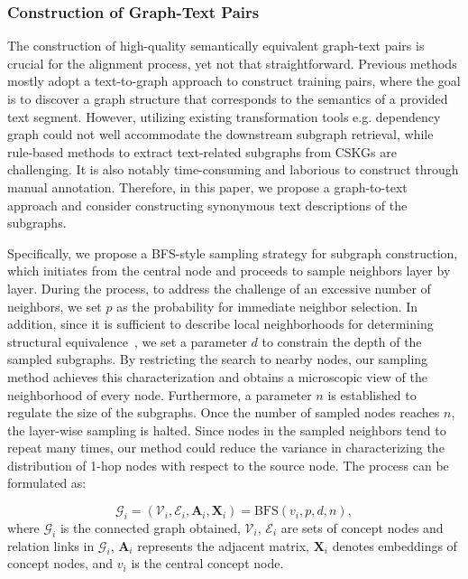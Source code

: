 \documentclass[runningheads]{llncs}
\begin{document}
\subsubsection{Construction of Graph-Text Pairs}
The construction of high-quality semantically equivalent graph-text pairs is crucial for the alignment process, yet not that straightforward. Previous methods mostly adopt a text-to-graph approach to construct training pairs, where the goal is to discover a graph structure that corresponds to the semantics of a provided text segment. However, utilizing existing transformation tools e.g. dependency graph could not well accommodate the downstream subgraph retrieval, while rule-based methods to extract text-related subgraphs from CSKGs are challenging. It is also notably time-consuming and laborious to construct through manual annotation. Therefore, in this paper, we propose a graph-to-text approach and consider constructing synonymous text descriptions of the subgraphs.

Specifically, we propose a BFS-style sampling strategy for subgraph construction, which initiates from the central node and proceeds to sample neighbors layer by layer. During the process, to address the challenge of an excessive number of neighbors, we set $p$ as the probability for immediate neighbor selection. In addition, since it is sufficient to describe local neighborhoods for determining structural equivalence~\cite{ref:node2vec}, we set a parameter $d$ to constrain the depth of the sampled subgraphs. By restricting the search to nearby nodes, our sampling method achieves this characterization and obtains a microscopic view of the neighborhood of every node. Furthermore, a parameter $n$ is established to regulate the size of the subgraphs. Once the number of sampled nodes reaches $n$, the layer-wise sampling is halted. Since nodes in the sampled neighbors tend to repeat many times, our method could reduce the variance in characterizing the distribution of 1-hop nodes with respect to the source node. The process can be formulated as:

\begin{equation}
    \mathcal{G}_i = (\mathcal{V}_i, \mathcal{E}_i, \boldsymbol{A}_i, \boldsymbol{X}_i) = \text{BFS}(v_i, p, d, n),
\end{equation}
where $\mathcal{G}_i$ is the connected graph obtained, $\mathcal{V}_i$, $\mathcal{E}_i$ are sets of concept nodes and relation links in $\mathcal{G}_i$, $\boldsymbol{A}_i$ represents the adjacent matrix, $\boldsymbol{X}_i$ denotes embeddings of concept nodes, and $v_i$ is the central concept node.
\end{document}
